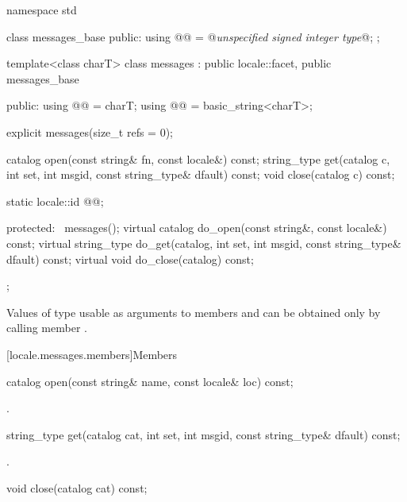%
%
\begin{codeblock}
namespace std {
  class messages_base {
  public:
    using @@ = @\textit{unspecified signed integer type}@;
  };

  template<class charT>
  class messages : public locale::facet, public messages_base {
  public:
    using @@   = charT;
    using @@ = basic_string<charT>;

    explicit messages(size_t refs = 0);

    catalog open(const string& fn, const locale&) const;
    string_type get(catalog c, int set, int msgid,
                    const string_type& dfault) const;
    void close(catalog c) const;

    static locale::id @@;

  protected:
    ~messages();
    virtual catalog do_open(const string&, const locale&) const;
    virtual string_type do_get(catalog, int set, int msgid,
                               const string_type& dfault) const;
    virtual void do_close(catalog) const;
  };
}
\end{codeblock}

\pnum
Values of type 
usable as arguments to members  and 
can be obtained only by calling member .

[locale.messages.members]{Members}

%
\begin{itemdecl}
catalog open(const string& name, const locale& loc) const;
\end{itemdecl}

\begin{itemdescr}
\pnum
\returns
{}.
\end{itemdescr}

%
\begin{itemdecl}
string_type get(catalog cat, int set, int msgid, const string_type& dfault) const;
\end{itemdecl}

\begin{itemdescr}
\pnum
\returns
{}.
\end{itemdescr}

%
\begin{itemdecl}
void close(catalog cat) const;
\end{itemdecl}

